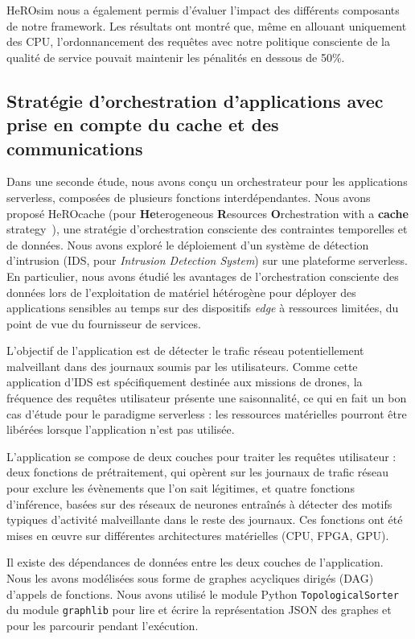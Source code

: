 HeROsim nous a également permis d'évaluer l'impact des différents composants de notre framework. Les résultats ont montré que, même en allouant uniquement des \gls{CPU}, l'ordonnancement des requêtes avec notre politique consciente de la qualité de service pouvait maintenir les pénalités en dessous de 50\%.

\subsection{Stratégie d'orchestration d'applications avec prise en compte du cache et des communications}

Dans une seconde étude, nous avons conçu un orchestrateur pour les applications serverless, composées de plusieurs fonctions interdépendantes. Nous avons proposé HeROcache (pour \textbf{He}terogeneous \textbf{R}esources \textbf{O}rchestration with a \textbf{cache} strategy~\cite{herocache}), une stratégie d'orchestration consciente des contraintes temporelles et de données. Nous avons exploré le déploiement d'un système de détection d'intrusion (\gls{IDS}, pour \textit{Intrusion Detection System}) sur une plateforme serverless. En particulier, nous avons étudié les avantages de l'orchestration consciente des données lors de l'exploitation de matériel hétérogène pour déployer des applications sensibles au temps sur des dispositifs \textit{edge} à ressources limitées, du point de vue du fournisseur de services.

L'objectif de l'application est de détecter le trafic réseau potentiellement malveillant dans des journaux soumis par les utilisateurs. Comme cette application d'\gls{IDS} est spécifiquement destinée aux missions de drones, la fréquence des requêtes utilisateur présente une saisonnalité, ce qui en fait un bon cas d'étude pour le paradigme serverless : les ressources matérielles pourront être libérées lorsque l'application n'est pas utilisée.

L'application se compose de deux couches pour traiter les requêtes utilisateur : deux fonctions de prétraitement, qui opèrent sur les journaux de trafic réseau pour exclure les évènements que l'on sait légitimes, et quatre fonctions d'inférence, basées sur des réseaux de neurones entraînés à détecter des motifs typiques d'activité malveillante dans le reste des journaux. Ces fonctions ont été mises en œuvre sur différentes architectures matérielles (\gls{CPU}, \gls{FPGA}, \gls{GPU}).

Il existe des dépendances de données entre les deux couches de l'application. Nous les avons modélisées sous forme de graphes acycliques dirigés (\gls{DAG}) d'appels de fonctions. Nous avons utilisé le module Python \texttt{TopologicalSorter} du module \texttt{graphlib} pour lire et écrire la représentation \gls{JSON} des graphes et pour les parcourir pendant l'exécution.


